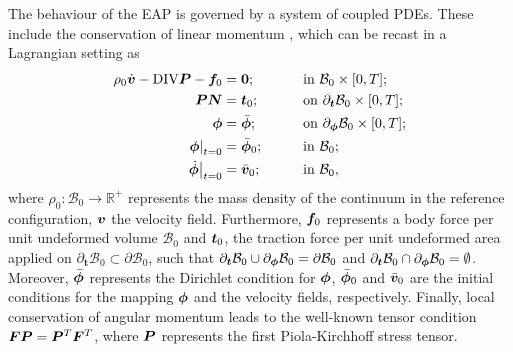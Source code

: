 The behaviour of the EAP is governed by a system of coupled PDEs. These include the conservation of linear momentum  \cite{Gonzalez_book}, which can be recast in a Lagrangian setting as
%
\begin{equation}\label{eqn:local form conservation of linear momentum}
\begin{aligned}
\rho_0\dot{\vect{v}} - \text{DIV}\vect{P} - \vect{f}_0& = \vect{0};&\qquad &\text{in}\,\,\mathcal{B}_0\times [0,T];\\
%
\vect{P}\vect{N}& = \vect{t}_0;&\qquad&\text{on}\,\,\partial_{\boldsymbol{t}}\mathcal{B}_0\times [0,T];\\
%
\vect{\phi} &= \bar{\vect{\phi}};&\qquad & \text{on}\,\,\partial_{\vect{\phi}}\mathcal{B}_0\times [0,T];\\
%
\left.{\vect{\phi}}\right\vert_{t=0}&=\bar{\vect{\phi}}_0;&\qquad
&\text{in}\,\,\mathcal{B}_0;\\
%
\left.\dot{\vect{\phi}}\right\vert_{t=0}&={\bar{\vect{v}}}_0;&\qquad &\text{in}\,\,\mathcal{B}_0,
%
\end{aligned}
\end{equation}
%
where $\rho_0: \mathcal{B}_0\rightarrow \mathbb{R}^{+}$ represents the mass density of the continuum in the reference configuration, $\boldsymbol{v}$ the velocity field.
Furthermore, $\boldsymbol{f}_0$ represents a body force per unit undeformed volume $\mathcal{B}_0$ and $\boldsymbol{t}_0$, the traction force per unit undeformed area applied on $\partial_{\boldsymbol{t}}\mathcal{B}_0\subset \partial \mathcal{B}_0$, such that $\partial_{\boldsymbol{t}}\mathcal{B}_0 \cup \partial_{\boldsymbol{\phi}}\mathcal{B}_0 = \partial\mathcal{B}_0$ and $\partial_{\boldsymbol{t}}\mathcal{B}_0 \cap \partial_{\boldsymbol{\phi}}\mathcal{B}_0 = \emptyset$. Moreover, $\bar{\boldsymbol{\phi}}$ represents the Dirichlet condition for $\boldsymbol{\phi}$, $\bar{\boldsymbol{\phi}}_0$ and ${\bar{\boldsymbol{v}}}_0$ are the initial conditions for the mapping $\boldsymbol{\phi}$ and the velocity fields, respectively.
Finally,  local conservation of angular momentum leads to the well-known tensor condition $\boldsymbol{F P} = \boldsymbol{P}^T\boldsymbol{F}^T$, where $\boldsymbol{P}$ represents the first Piola-Kirchhoff stress tensor. 
%

